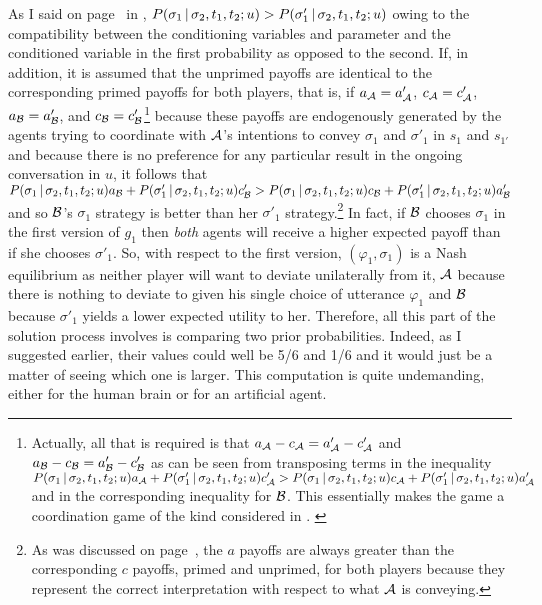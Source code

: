 As I said on page~\pageref{page:probability comparisons} in , $P(\sigma_1 \,|\, \sigma_2, t_1, t_2; u) > P(\sigma'_1 \,|\, \sigma_2, t_1, t_2; u)$ owing to the compatibility between the conditioning variables and parameter and the conditioned variable in the first probability as opposed to the second. If, in addition, it is assumed that the unprimed payoffs are identical to the corresponding primed payoffs for both players, that is, if $a_{\cal A} = a'_{\cal A}$, $c_{\cal A} = c'_{\cal A}$, $a_{\cal B} = a'_{\cal B}$, and $c_{\cal B} = c'_{\cal B}$\footnote{Actually, all that is required is that $a_{\cal A} - c_{\cal A} = a'_{\cal A} - c'_{\cal A}$ and $a_{\cal B} - c_{\cal B} = a'_{\cal B} - c'_{\cal B}$ as can be seen from transposing terms in the inequality $P(\sigma_1 \,|\, \sigma_2, t_1, t_2; u)a_{\cal A} + P(\sigma'_1 \,|\, \sigma_2, t_1, t_2; u)c'_{\cal A} > P(\sigma_1 \,|\, \sigma_2, t_1, t_2; u)c_{\cal A} + P(\sigma'_1 \,|\, \sigma_2, t_1, t_2; u)a'_{\cal A}$ and in the corresponding inequality for $\cal B$. This essentially makes the game a coordination game of the kind considered in . \label{foot:symmetric payoffs}} because these payoffs are endogenously generated by the agents trying to coordinate with $\cal A$'s intentions to convey $\sigma_1$ and $\sigma'_1$ in $s_1$ and $s_{1'}$ and because there is no preference for any particular result in the ongoing conversation in $u$, it follows that $P(\sigma_1 \,|\, \sigma_2, t_1, t_2; u)a_{\cal B} + P(\sigma'_1 \,|\, \sigma_2, t_1, t_2; u)c'_{\cal B} > P(\sigma_1 \,|\, \sigma_2, t_1, t_2; u)c_{\cal B} + P(\sigma'_1 \,|\, \sigma_2, t_1, t_2; u)a'_{\cal B}$ and so $\cal B$'s $\sigma_1$ strategy is better than her $\sigma'_1$ strategy.\footnote{As was discussed on page~\pageref{page:payoff comparisons}, the $a$ payoffs are always greater than the corresponding $c$ payoffs, primed and unprimed, for both players because they represent the correct interpretation with respect to what $\cal A$ is conveying.} In fact, if $\cal B$ chooses $\sigma_1$ in the first version of $g_1$ then \emph{both} agents will receive a higher expected payoff than if she chooses $\sigma'_1$. So, with respect to the first version, $(\varphi_1, \sigma_1)$ is a Nash equilibrium as neither player will want to deviate unilaterally from it, $\cal A$ because there is nothing to deviate to given his single choice of utterance $\varphi_1$ and $\cal B$ because $\sigma'_1$ yields a lower expected utility to her. Therefore, all this part of the solution process involves is comparing two prior probabilities. Indeed, as I suggested earlier, their values could well be 5/6 and 1/6 and it would just be a matter of seeing which one is larger. This computation is quite undemanding, either for the human brain or for an artificial agent. 

